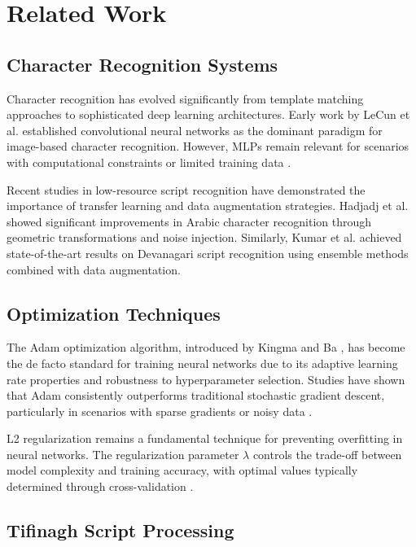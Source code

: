 \documentclass[12pt,a4paper]{article}
\begin{document}
	\section{Related Work}
	
	\subsection{Character Recognition Systems}
	
	Character recognition has evolved significantly from template matching approaches to sophisticated deep learning architectures. Early work by LeCun et al. \cite{lecun_mnist} established convolutional neural networks as the dominant paradigm for image-based character recognition. However, MLPs remain relevant for scenarios with computational constraints or limited training data \cite{mlp_relevance}.
	
	Recent studies in low-resource script recognition have demonstrated the importance of transfer learning and data augmentation strategies. Hadjadj et al. \cite{arabic_ocr} showed significant improvements in Arabic character recognition through geometric transformations and noise injection. Similarly, Kumar et al. \cite{devanagari_ocr} achieved state-of-the-art results on Devanagari script recognition using ensemble methods combined with data augmentation.
	
	\subsection{Optimization Techniques}
	
	The Adam optimization algorithm, introduced by Kingma and Ba \cite{adam_optimizer}, has become the de facto standard for training neural networks due to its adaptive learning rate properties and robustness to hyperparameter selection. Studies have shown that Adam consistently outperforms traditional stochastic gradient descent, particularly in scenarios with sparse gradients or noisy data \cite{optimization_comparison}.
	
	L2 regularization remains a fundamental technique for preventing overfitting in neural networks. The regularization parameter $\lambda$ controls the trade-off between model complexity and training accuracy, with optimal values typically determined through cross-validation \cite{regularization_survey}.
	
	\subsection{Tifinagh Script Processing}
	
\end{document}
